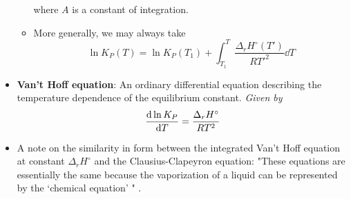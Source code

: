 \documentclass[../notes.tex]{subfiles}
\begin{document}
\begin{itemize}
\begin{itemize}
\begin{itemize}
        \end{itemize}
        where $A$ is a constant of integration.
        \item More generally, we may always take
        \begin{equation*}
            \ln K_P(T) = \ln K_P(T_1)+\int_{T_1}^T\frac{\Delta_rH^\circ(T')}{RT'^2}\dd{T}
        \end{equation*}
    \end{itemize}
    \item \textbf{Van't Hoff equation}: An ordinary differential equation describing the temperature dependence of the equilibrium constant. \emph{Given by}
    \begin{equation*}
        \dv{\ln K_P}{T} = \frac{\Delta_rH^\circ}{RT^2}
    \end{equation*}
    \item A note on the similarity in form between the integrated Van't Hoff equation at constant $\Delta_rH^\circ$ and the Clausius-Clapeyron equation: "These equations are essentially the same because the vaporization of a liquid can be represented by the `chemical equation' " \parencite[980]{bib:McQuarrieSimon}.
\end{itemize}
\end{document}

